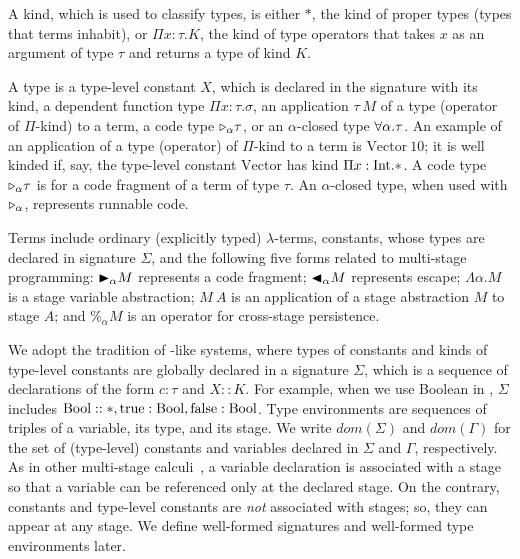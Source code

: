 
A kind, which is used to classify types, is either $*$, the kind of
proper types (types that terms inhabit), or $\Pi x\colon\tau.K$, the kind
of type operators that takes $x$ as an argument of type $\tau$ and returns a type
of kind $K$.


A type is a type-level constant $X$, which is declared in the signature with its kind, a dependent function type $\Pi x:\tau.\sigma$,
an application $\tau\ M$ of a type (operator of $\Pi$-kind) to a term, a code type ${\mathop{\triangleright}}_\alpha \tau$, or an $\alpha$-closed type $\forall\alpha.\tau$.
An example of an application of a type (operator) of $\Pi$-kind to a term is $\text{Vector}\ 10$; it is well kinded
if, say, the type-level constant $\text{Vector}$ has kind $\Pi x:\textrm{Int}.*$.
A code type ${\mathop{\triangleright}}_\alpha \tau$ is for a code fragment of a term of type $\tau$.
An $\alpha$-closed type, when used with ${\mathop{\triangleright}}_\alpha$, represents runnable code.


Terms include ordinary (explicitly typed) \(\lambda\)-terms, constants,
whose types are declared in signature $\Sigma$, and the following five forms
related to multi-stage programming:
${\mathop{\blacktriangleright}}_\alpha M$ represents a code fragment; ${\mathop{\blacktriangleleft}}_\alpha M$ represents escape;
$\Lambda\alpha.M$ is a stage variable abstraction;
$M\ A$ is an application of a stage abstraction $M$ to stage $A$; and
$\%_\alpha M$ is an operator for cross-stage persistence.


We adopt the tradition of \LLF-like systems, where types of constants and
kinds of type-level constants are globally declared in a signature $\Sigma$,
which is a sequence of declarations of the form $c:\tau$ and $X::K$. For
example, when we use Boolean in \LMD, $\Sigma$ includes $\textrm{Bool} :: *,
\textrm{true}:\textrm{Bool}, \textrm{false}:\textrm{Bool}$. Type environments are sequences of
triples of a variable, its type, and its stage. We write
\(\textit{dom}(\Sigma)\) and \(\textit{dom}(\Gamma)\) for the set of
(type-level) constants and variables declared in \(\Sigma\) and \(\Gamma\),
respectively. As in other multi-stage
calculi~\cite{taha2003environment,Tsukada,Hanada2014}, a variable declaration
is associated with a stage so that a variable can be referenced only at the
declared stage. On the contrary, constants and type-level constants are
\emph{not} associated with stages; so, they can appear at any stage. We
define well-formed signatures and well-formed type environments later.

